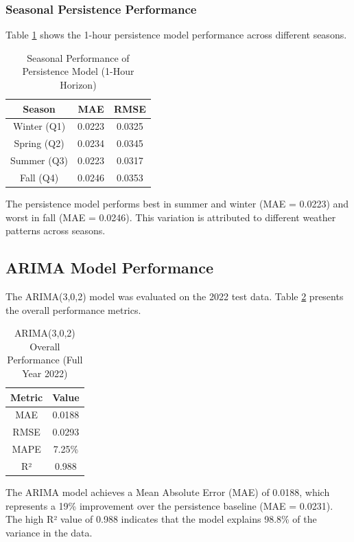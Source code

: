\documentclass[12pt,a4paper]{article}
\begin{document}
\subsubsection{Seasonal Persistence Performance}

Table \ref{tab:persistence_seasonal} shows the 1-hour persistence model performance across different seasons.

\begin{table}[H]
\centering
\caption{Seasonal Performance of Persistence Model (1-Hour Horizon)}
\label{tab:persistence_seasonal}
\begin{tabular}{c|c|c}
\hline
\textbf{Season} & \textbf{MAE} & \textbf{RMSE} \\
\hline
Winter (Q1) & 0.0223 & 0.0325 \\
Spring (Q2) & 0.0234 & 0.0345 \\
Summer (Q3) & 0.0223 & 0.0317 \\
Fall (Q4) & 0.0246 & 0.0353 \\
\hline
\end{tabular}
\end{table}

The persistence model performs best in summer and winter (MAE = 0.0223) and worst in fall (MAE = 0.0246). This variation is attributed to different weather patterns across seasons.

\subsection{ARIMA Model Performance}

The ARIMA(3,0,2) model was evaluated on the 2022 test data. Table \ref{tab:arima_overall} presents the overall performance metrics.

\begin{table}[H]
\centering
\caption{ARIMA(3,0,2) Overall Performance (Full Year 2022)}
\label{tab:arima_overall}
\begin{tabular}{c|c}
\hline
\textbf{Metric} & \textbf{Value} \\
\hline
MAE & 0.0188 \\
RMSE & 0.0293 \\
MAPE & 7.25\% \\
R² & 0.988 \\
\hline
\end{tabular}
\end{table}

The ARIMA model achieves a Mean Absolute Error (MAE) of 0.0188, which represents a 19\% improvement over the persistence baseline (MAE = 0.0231). The high R² value of 0.988 indicates that the model explains 98.8\% of the variance in the data.
\end{document}
